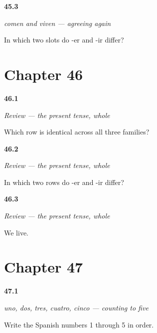 \noindent\begin{minipage}[t]{\linewidth}
\raggedright
\hypertarget{review-ES-C07-comen-viven-where}{\textbf{45.3}} \emph{comen and viven — agreeing again}\par
\small In which two slots do -er and -ir differ?
\end{minipage}\par\medskip

\section*{Chapter 46}

\noindent\begin{minipage}[t]{\linewidth}
\raggedright
\hypertarget{review-ES-C07-repaso-tres-familias-yo}{\textbf{46.1}} \emph{Review — the present tense, whole}\par
\small Which row is identical across all three families?
\end{minipage}\par\medskip

\noindent\begin{minipage}[t]{\linewidth}
\raggedright
\hypertarget{review-ES-C07-repaso-tres-familias-diff}{\textbf{46.2}} \emph{Review — the present tense, whole}\par
\small In which two rows do -er and -ir differ?
\end{minipage}\par\medskip

\noindent\begin{minipage}[t]{\linewidth}
\raggedright
\hypertarget{review-ES-C07-repaso-tres-familias-live}{\textbf{46.3}} \emph{Review — the present tense, whole}\par
\small We live.
\end{minipage}\par\medskip

\section*{Chapter 47}

\noindent\begin{minipage}[t]{\linewidth}
\raggedright
\hypertarget{review-ES-C08-numeros-1-5-count}{\textbf{47.1}} \emph{uno, dos, tres, cuatro, cinco — counting to five}\par
\small Write the Spanish numbers 1 through 5 in order.
\end{minipage}\par\medskip

